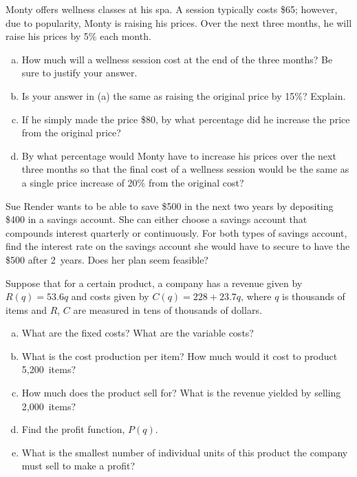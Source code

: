 \documentclass[11pt,letterpaper]{article}
\begin{document}
\prob Monty offers wellness classes at his spa. A session typically costs \$65; however, due to popularity, Monty is raising his prices. Over the next three months, he will raise his prices by 5\% each month. 
	\begin{enumerate}[(a)]
	\item How much will a wellness session cost at the end of the three months? Be sure to justify your answer. 
	\item Is your answer in (a) the same as raising the original price by 15\%? Explain. 
	\item If he simply made the price \$80, by what percentage did he increase the price from the original price?
	\item By what percentage would Monty have to increase his prices over the next three months so that the final cost of a wellness session would be the same as a single price increase of 20\% from the original cost?
	\end{enumerate} \pspace
	
	
\prob	 Sue Render wants to be able to save \$500 in the next two years by depositing \$400 in a savings account. She can either choose a savings account that compounds interest quarterly or continuously. For both types of savings account, find the interest rate on the savings account she would have to secure to have the \$500 after 2~years. Does her plan seem feasible? \pspace 
	
	
\prob	 Suppose that for a certain product, a company has a revenue given by $R(q)= 53.6q$ and costs given by $C(q)= 228 + 23.7q$, where $q$ is thousands of items and $R$, $C$ are measured in tens of thousands of dollars.
	\begin{enumerate}[(a)]
	\item What are the fixed costs? What are the variable costs?
	\item What is the cost production per item? How much would it cost to product 5,200~items?
	\item How much does the product sell for? What is the revenue yielded by selling 2,000~items?
	\item Find the profit function, $P(q)$.
	\item What is the smallest number of individual units of this product the company must sell to make a profit?
	\end{enumerate} \pspace
	
\end{document}
